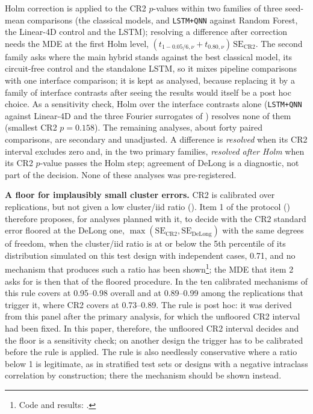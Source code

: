 \documentclass[11pt,a4paper]{article}
\begin{document}
Holm correction is applied to the CR2 $p$-values within two families of three seed-mean comparisons (the classical models, and \texttt{LSTM+QNN} against Random Forest, the Linear-4D control and the LSTM); resolving a difference after correction needs the MDE at the first Holm level, $(t_{1-0.05/6,\nu}+t_{0.80,\nu})\,\text{SE}_{\text{CR2}}$. The second family asks where the main hybrid stands against the best classical model, its circuit-free control and the standalone LSTM, so it mixes pipeline comparisons with one interface comparison; it is kept as analysed, because replacing it by a family of interface contrasts after seeing the results would itself be a post hoc choice. As a sensitivity check, Holm over the interface contrasts alone (\texttt{LSTM+QNN} against Linear-4D and the three Fourier surrogates of ) resolves none of them (smallest CR2 $p=0.158$). The remaining analyses, about forty paired comparisons, are secondary and unadjusted. A difference is \emph{resolved} when its CR2 interval excludes zero and, in the two primary families, \emph{resolved after Holm} when its CR2 $p$-value passes the Holm step; agreement of DeLong is a diagnostic, not part of the decision. None of these analyses was pre-registered.

\textbf{A floor for implausibly small cluster errors.} CR2 is calibrated over replications, but not given a low cluster/iid ratio (). Item 1 of the protocol () therefore proposes, for analyses planned with it, to decide with the CR2 standard error floored at the DeLong one, $\max(\text{SE}_{\text{CR2}},\text{SE}_{\text{DeLong}})$ with the same degrees of freedom, when the cluster/iid ratio is at or below the 5th percentile of its distribution simulated on this test design with independent cases, 0.71, and no mechanism that produces such a ratio has been shown\footnote{Code and results: .}; the MDE that item 2 asks for is then that of the floored procedure. In the ten calibrated mechanisms of  this rule covers at 0.95--0.98 overall and at 0.89--0.99 among the replications that trigger it, where CR2 covers at 0.73--0.89. The rule is post hoc: it was derived from this panel after the primary analysis, for which the unfloored CR2 interval had been fixed. In this paper, therefore, the unfloored CR2 interval decides and the floor is a sensitivity check; on another design the trigger has to be calibrated before the rule is applied. The rule is also needlessly conservative where a ratio below 1 is legitimate, as in stratified test sets or designs with a negative intraclass correlation by construction; there the mechanism should be shown instead.
\end{document}
